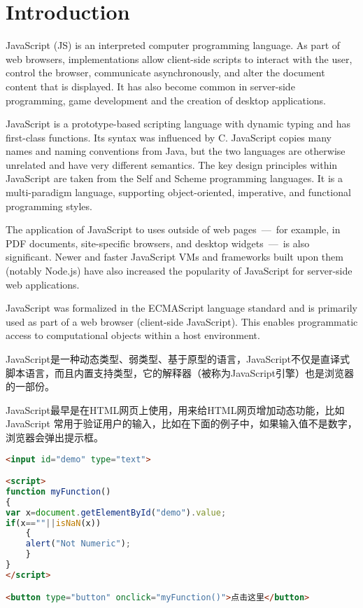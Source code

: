 \part{Introduction}

JavaScript (JS)\cite{javascript} is an interpreted computer programming language. As part of web browsers, implementations allow client-side scripts to interact with the user, control the browser, communicate asynchronously, and alter the document content that is displayed. It has also become common in server-side programming, game development and the creation of desktop applications.


JavaScript is a prototype-based scripting language with dynamic typing and has first-class functions. Its syntax was influenced by C. JavaScript copies many names and naming conventions from Java, but the two languages are otherwise unrelated and have very different semantics. The key design principles within JavaScript are taken from the Self and Scheme programming languages. It is a multi-paradigm language, supporting object-oriented, imperative, and functional programming styles.


The application of JavaScript to uses outside of web pages~—~for example, in PDF documents, site-specific browsers, and desktop widgets~—~is also significant. Newer and faster JavaScript VMs and frameworks built upon them (notably Node.js) have also increased the popularity of JavaScript for server-side web applications.

JavaScript was formalized in the ECMAScript language standard and is primarily used as part of a web browser (client-side JavaScript). This enables programmatic access to computational objects within a host environment.

JavaScript是一种动态类型、弱类型、基于原型的语言，JavaScript不仅是直译式脚本语言，而且内置支持类型，它的解释器（被称为JavaScript引擎）也是浏览器的一部份。



JavaScript最早是在HTML网页上使用，用来给HTML网页增加动态功能，比如JavaScript 常用于验证用户的输入，比如在下面的例子中，如果输入值不是数字，浏览器会弹出提示框。



\begin{lstlisting}[language=HTML]
<input id="demo" type="text">

<script>
function myFunction()
{
var x=document.getElementById("demo").value;
if(x==""||isNaN(x))
	{
	alert("Not Numeric");
	}
}
</script>

<button type="button" onclick="myFunction()">点击这里</button>
\end{lstlisting}

